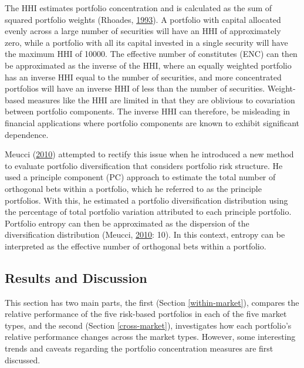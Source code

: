 \documentclass[11pt,preprint, authoryear]{elsarticle}
\numberwithin{equation}{section}
\numberwithin{figure}{section}
\numberwithin{table}{section}
\begin{document}
The HHI estimates portfolio concentration and is calculated as the sum
of squared portfolio weights (Rhoades,
\protect\hyperlink{ref-rhoades1993}{1993}). A portfolio with capital
allocated evenly across a large number of securities will have an HHI of
approximately zero, while a portfolio with all its capital invested in a
single security will have the maximum HHI of 10000. The effective number
of constitutes (ENC) can then be approximated as the inverse of the HHI,
where an equally weighted portfolio has an inverse HHI equal to the
number of securities, and more concentrated portfolios will have an
inverse HHI of less than the number of securities. Weight-based measures
like the HHI are limited in that they are oblivious to covariation
between portfolio components. The inverse HHI can therefore, be
misleading in financial applications where portfolio components are
known to exhibit significant dependence.

Meucci (\protect\hyperlink{ref-meucci2010}{2010}) attempted to rectify
this issue when he introduced a new method to evaluate portfolio
diversification that considers portfolio risk structure. He used a
principle component (PC) approach to estimate the total number of
orthogonal bets within a portfolio, which he referred to as the
principle portfolios. With this, he estimated a portfolio
diversification distribution using the percentage of total portfolio
variation attributed to each principle portfolio. Portfolio entropy can
then be approximated as the dispersion of the diversification
distribution (Meucci, \protect\hyperlink{ref-meucci2010}{2010}: 10). In
this context, entropy can be interpreted as the effective number of
orthogonal bets within a portfolio.

\newpage

\hypertarget{results-and-discussion}{%
\subsection{\texorpdfstring{Results and Discussion
\label{reasults}}{Results and Discussion }}\label{results-and-discussion}}

This section has two main parts, the first (Section
\ref{within-market}), compares the relative performance of the five
risk-based portfolios in each of the five market types, and the second
(Section \ref{cross-market}), investigates how each portfolio's relative
performance changes across the market types. However, some interesting
trends and caveats regarding the portfolio concentration measures are
first discussed.
\end{document}
